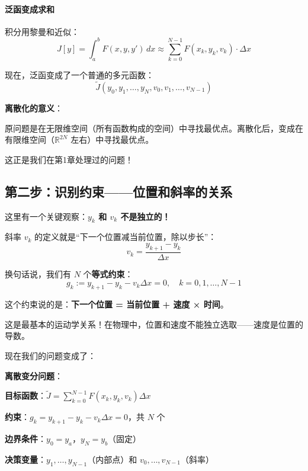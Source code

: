 
\paragraph{泛函变成求和}

积分用黎曼和近似：
\[
J[y] = \int_a^b F(x, y, y') \, dx \approx \sum_{k=0}^{N-1} F(x_k, y_k, v_k) \cdot \Delta x
\]

现在，泛函变成了一个普通的多元函数：
\[
\tilde{J}(y_0, y_1, \ldots, y_N, v_0, v_1, \ldots, v_{N-1})
\]

\begin{insightbox}
\textbf{离散化的意义}：

原问题是在无限维空间（所有函数构成的空间）中寻找最优点。离散化后，变成在有限维空间（$\mathbb{R}^{2N}$ 左右）中寻找最优点。

这正是我们在第1章处理过的问题！
\end{insightbox}

\subsection{第二步：识别约束——位置和斜率的关系}

这里有一个关键观察：\textbf{$y_k$ 和 $v_k$ 不是独立的！}

斜率 $v_k$ 的定义就是“下一个位置减当前位置，除以步长”：
\[
v_k = \frac{y_{k+1} - y_k}{\Delta x}
\]

换句话说，我们有 $N$ 个\textbf{等式约束}：
\begin{equation}
\boxed{g_k := y_{k+1} - y_k - v_k \Delta x = 0, \quad k = 0, 1, \ldots, N-1}
\end{equation}

\begin{physicalmeaning}
这个约束说的是：\textbf{下一个位置 = 当前位置 + 速度 × 时间}。

这是最基本的运动学关系！在物理中，位置和速度不能独立选取——速度是位置的导数。
\end{physicalmeaning}

现在我们的问题变成了：

\begin{tcolorbox}[colback=blue!5, colframe=blue!60!black]
\textbf{离散变分问题}：

\textbf{目标函数}：$\tilde{J} = \sum_{k=0}^{N-1} F(x_k, y_k, v_k) \Delta x$

\textbf{约束}：$g_k = y_{k+1} - y_k - v_k \Delta x = 0$，共 $N$ 个

\textbf{边界条件}：$y_0 = y_a$，$y_N = y_b$（固定）

\textbf{决策变量}：$y_1, \ldots, y_{N-1}$（内部点）和 $v_0, \ldots, v_{N-1}$（斜率）
\end{tcolorbox}

